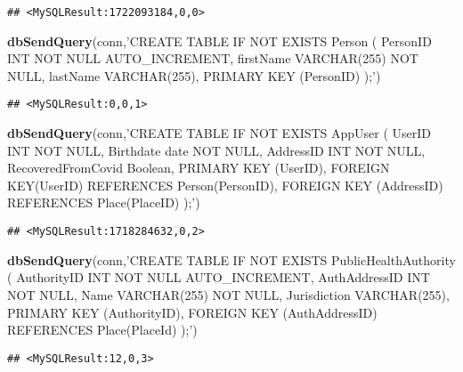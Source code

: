 \documentclass[
]{article}
\newenvironment{Shaded}{\begin{snugshade}}{\end{snugshade}}
\newcommand{\KeywordTok}[1]{\textcolor[rgb]{0.13,0.29,0.53}{\textbf{#1}}}
\newcommand{\NormalTok}[1]{#1}
\newcommand{\StringTok}[1]{\textcolor[rgb]{0.31,0.60,0.02}{#1}}
\begin{document}
\begin{verbatim}
## <MySQLResult:1722093184,0,0>
\end{verbatim}

\begin{Shaded}
\begin{Highlighting}[]
\KeywordTok{dbSendQuery}\NormalTok{(conn,}\StringTok{'CREATE TABLE IF NOT EXISTS Person (}
\StringTok{  PersonID INT NOT NULL AUTO_INCREMENT, }
\StringTok{  firstName VARCHAR(255) NOT NULL, }
\StringTok{  lastName VARCHAR(255), }
\StringTok{  PRIMARY KEY (PersonID)}
\StringTok{);'}\NormalTok{)}
\end{Highlighting}
\end{Shaded}

\begin{verbatim}
## <MySQLResult:0,0,1>
\end{verbatim}

\begin{Shaded}
\begin{Highlighting}[]
\KeywordTok{dbSendQuery}\NormalTok{(conn,}\StringTok{'CREATE TABLE IF NOT EXISTS AppUser (}
\StringTok{  UserID INT NOT NULL, }
\StringTok{  Birthdate date NOT NULL, }
\StringTok{  AddressID INT NOT NULL, }
\StringTok{  RecoveredFromCovid Boolean, }
\StringTok{  PRIMARY KEY (UserID), }
\StringTok{  FOREIGN KEY(UserID) REFERENCES Person(PersonID), }
\StringTok{  FOREIGN KEY (AddressID) REFERENCES Place(PlaceID)}
\StringTok{);'}\NormalTok{)}
\end{Highlighting}
\end{Shaded}

\begin{verbatim}
## <MySQLResult:1718284632,0,2>
\end{verbatim}

\begin{Shaded}
\begin{Highlighting}[]
\KeywordTok{dbSendQuery}\NormalTok{(conn,}\StringTok{'CREATE TABLE IF NOT EXISTS PublicHealthAuthority (}
\StringTok{  AuthorityID INT NOT NULL AUTO_INCREMENT, }
\StringTok{  AuthAddressID INT NOT NULL, }
\StringTok{  Name VARCHAR(255) NOT NULL, }
\StringTok{  Jurisdiction VARCHAR(255), }
\StringTok{  PRIMARY KEY (AuthorityID), }
\StringTok{  FOREIGN KEY (AuthAddressID) REFERENCES Place(PlaceId)}
\StringTok{);'}\NormalTok{)}
\end{Highlighting}
\end{Shaded}

\begin{verbatim}
## <MySQLResult:12,0,3>
\end{verbatim}
\end{document}
